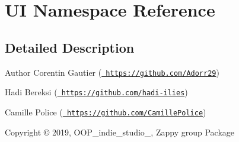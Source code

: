 \hypertarget{namespace_u_i}{}\section{UI Namespace Reference}
\label{namespace_u_i}


\subsection{Detailed Description}
\begin{DoxyAuthor}{Author}
Corentin Gautier (\href{https://github.com/Adorr29}{\texttt{ https\+://github.\+com/\+Adorr29}}) 

Hadi Bereksi (\href{https://github.com/hadi-ilies}{\texttt{ https\+://github.\+com/hadi-\/ilies}}) 

Camille Police (\href{https://github.com/CamillePolice}{\texttt{ https\+://github.\+com/\+Camille\+Police}}) 
\end{DoxyAuthor}
\begin{DoxyCopyright}{Copyright}
© 2019, O\+O\+P\+\_\+indie\+\_\+studio\+\_, Zappy group Package 
\end{DoxyCopyright}
